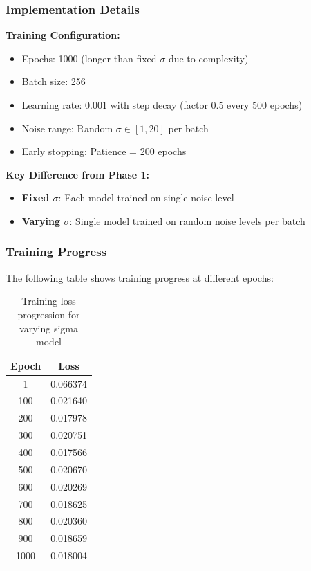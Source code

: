 \documentclass[journal]{IEEEtran}
\begin{document}
\subsubsection{Implementation Details}

\textbf{Training Configuration:}
\begin{itemize}
    \item Epochs: 1000 (longer than fixed $\sigma$ due to complexity)
    \item Batch size: 256
    \item Learning rate: 0.001 with step decay (factor 0.5 every 500 epochs)
    \item Noise range: Random $\sigma \in [1, 20]$ per batch
    \item Early stopping: Patience = 200 epochs
\end{itemize}

\textbf{Key Difference from Phase 1:}
\begin{itemize}
    \item \textbf{Fixed $\sigma$}: Each model trained on single noise level
    \item \textbf{Varying $\sigma$}: Single model trained on random noise levels per batch
\end{itemize}

\subsubsection{Training Progress}

The following table shows training progress at different epochs:

\begin{table}[H]
\centering
\begin{tabular}{cc}
\toprule
Epoch & Loss \\
\midrule
1 & 0.066374 \\
100 & 0.021640 \\
200 & 0.017978 \\
300 & 0.020751 \\
400 & 0.017566 \\
500 & 0.020670 \\
600 & 0.020269 \\
700 & 0.018625 \\
800 & 0.020360 \\
900 & 0.018659 \\
1000 & 0.018004 \\
\bottomrule
\end{tabular}
\caption{Training loss progression for varying sigma model}
\label{tab:varying_sigma_progress}
\end{table}
\end{document}
